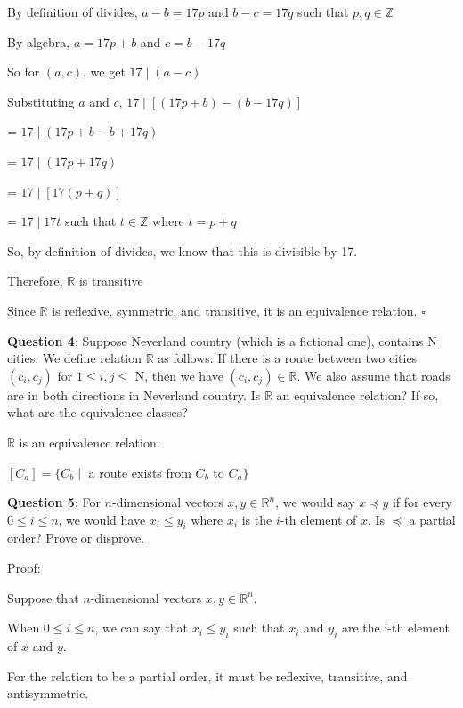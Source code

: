 \documentclass{article} %
\newcommand{\question}[2][]{\begin{flushleft}
        \textbf{Question #1}: #2
\end{flushleft}}
\begin{document}
    \tabto{1cm} By definition of divides, $a - b = 17p$ and $b - c = 17q$ such that $p, q \in \mathbb{Z}$

    \tabto{1cm} By algebra, $a = 17p + b$ and $c = b - 17q$

    \tabto{1cm} So for $(a, c)$, we get $17 \mid (a - c)$

    \tabto{1cm} Substituting $a$ and $c$, $17 \mid [(17p + b) - (b - 17q)]$

    \tabto{3.98 cm} = $17 \mid (17p + b - b + 17q)$

    \tabto{3.98 cm} = $17 \mid (17p + 17q)$

    \tabto{3.98 cm} = $17 \mid [17(p + q)]$

    \tabto{3.98 cm} = $17 \mid 17t$ such that $t \in \mathbb{Z}$ where $t = p + q$

    \tabto{1cm} So, by definition of divides, we know that this is divisible by 17.

    \tabto{1cm} Therefore, $\mathbb{R}$ is transitive

    Since $\mathbb{R}$ is reflexive, symmetric, and transitive, it is an equivalence relation. $\square$

    \question[4]{Suppose Neverland country (which is a fictional one), contains N cities. We define 
    relation $\mathbb{R}$ as follows: If there is a route between two cities $(c_i, c_j)$ for $1 \leq i, j \leq$ N, then we have
    $(c_i, c_j) \in \mathbb{R}$. We also assume that roads are in both directions in Neverland country. Is $\mathbb{R}$ an 
    equivalence relation? If so, what are the equivalence classes?}

    $\mathbb{R}$ is an equivalence relation.

    $[C_a] = \{C_b \mid$ a route exists from $C_b$ to $C_a \}$

    \newpage

    \question[5]{For $n$-dimensional vectors $x, y \in \mathbb{R}^n$, we would say $x \preceq y$ if for every $0 \leq i \leq n$, we
    would have $x_i \leq y_i$ where $x_i$ is the $i$-th element of $x$. Is $\preceq$ a partial order? Prove or disprove.}

    Proof:

    Suppose that $n$-dimensional vectors $x, y \in \mathbb{R}^n$.

    When $0 \leq i \leq n$, we can say that $x_i \leq y_i$ such that $x_i$ and $y_i$ are the i-th element of $x$ and $y$.

    For the relation to be a partial order, it must be reflexive, transitive, and antisymmetric.
\end{document}
